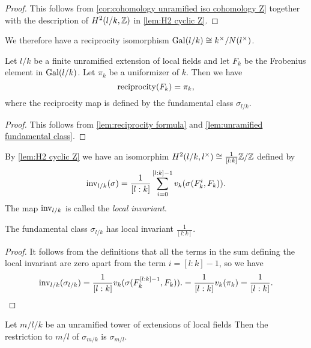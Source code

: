 \begin{proof}
	This follows from \ref{cor:cohomology unramified iso cohomology Z}
	together with the description of $H^2(l/k,{\mathbb Z})$ in \ref{lem:H2 cyclic Z}.
\end{proof}

We therefore have a reciprocity isomorphism $\mathrm{Gal}(l/k) \cong k^\times / N(l^\times)$.

\begin{lemma} \label{lem:local unramified reciprocity}
	Let $l/k$ be a finite unramified extension of local fields and let $F_k$ be the Frobenius
	element in $\mathrm{Gal}(l/k)$. Let $\pi_k$ be a uniformizer of $k$. Then we have
	\[
		\mathrm{reciprocity} (F_k)= \pi_k,
	\]
	where the reciprocity map is defined by the fundamental class $\sigma_{l/k}$.
\end{lemma}

\begin{proof}
	This follows from \ref{lem:reciprocity formula} and \ref{lem:unramified fundamental class}.
\end{proof}


\begin{definition} \label{def:local inv}
	By \ref{lem:H2 cyclic Z} we have an isomorphim $H^2(l/k, l^\times) \cong \frac{1}{[l:k]}{\mathbb Z} / {\mathbb Z}$
	defined by
	\[
		\mathrm{inv}_{l/k}(\sigma) = \frac{1}{[l:k]} \sum_{i=0}^{[l:k]-1} v_k(\sigma(F_k^i, F_k)).
	\]
	The map $\mathrm{inv}_{l/k}$ is called the \emph{local invariant}.
\end{definition}

\begin{lemma} \label{lem:local inv fundamental class}
	The fundamental class $\sigma_{l/k}$ has local invariant $\frac{1}{[l:k]}$.
\end{lemma}

\begin{proof}
	It follows from the definitions that all the terms in the sum defining the local invariant are zero
	apart from the term $i=[l:k]-1$, so we have
	\[
		\mathrm{inv}_{l/k}(\sigma_{l/k})
		= \frac{1}{[l:k]} v_k(\sigma(F_k^{[l:k]-1}, F_k)).
		= \frac{1}{[l:k]} v_k(\pi_k)
		= \frac{1}{[l:k]}.
	\]
\end{proof}


\begin{lemma} \label{lem:local unram rest}
	Let $m / l / k$ be an unramified tower of extensions of local fields
	Then the restriction to $m/l$ of $\sigma_{m/k}$ is $\sigma_{m/l}$.
\end{lemma}

